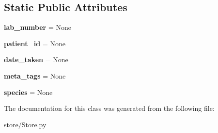 \subsection*{Static Public Attributes}
\begin{DoxyCompactItemize}
\item 
\hypertarget{classstore_1_1_store_1_1_isolate_ab6c42ec02ecd9a44732058c4aae265c9}{{\bfseries lab\-\_\-number} = None}\label{classstore_1_1_store_1_1_isolate_ab6c42ec02ecd9a44732058c4aae265c9}

\item 
\hypertarget{classstore_1_1_store_1_1_isolate_ae75afdb7ee3b0064c954d04137a780e8}{{\bfseries patient\-\_\-id} = None}\label{classstore_1_1_store_1_1_isolate_ae75afdb7ee3b0064c954d04137a780e8}

\item 
\hypertarget{classstore_1_1_store_1_1_isolate_aeb1865270e2f3c91a369dfe3ee623e48}{{\bfseries date\-\_\-taken} = None}\label{classstore_1_1_store_1_1_isolate_aeb1865270e2f3c91a369dfe3ee623e48}

\item 
\hypertarget{classstore_1_1_store_1_1_isolate_a7b8b6b0088488d655bf0c0eba25f22ba}{{\bfseries meta\-\_\-tags} = None}\label{classstore_1_1_store_1_1_isolate_a7b8b6b0088488d655bf0c0eba25f22ba}

\item 
\hypertarget{classstore_1_1_store_1_1_isolate_a8b199b47690abc162813695ed87aa789}{{\bfseries species} = None}\label{classstore_1_1_store_1_1_isolate_a8b199b47690abc162813695ed87aa789}

\end{DoxyCompactItemize}


The documentation for this class was generated from the following file\-:\begin{DoxyCompactItemize}
\item 
store/Store.\-py\end{DoxyCompactItemize}
